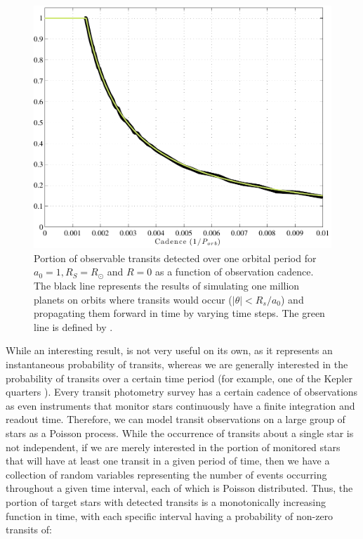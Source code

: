 \begin{figure}[ht]
\centering
\includegraphics[width=5in]{./figures/transitCadences}
\caption[Portion of observable transits detected over one period.]{Portion of observable transits detected over one orbital period for $a_0 = 1, R_S = R_\odot$ and $R = 0$ as a function of observation cadence. The black line represents the results of simulating one million planets on orbits where transits would occur ($\vert \theta \vert  < R_s/a_0$) and propagating them forward in time by varying time steps.  The green line is defined by .
\label{fig:transitCadences}}
\end{figure}
While an interesting result,  is not very useful on its own, as it represents an instantaneous probability of transits, whereas we are generally interested in the probability of transits over a certain time period (for example, one of the Kepler quarters \citep{borucki2010kepler}).  Every transit photometry survey has a certain cadence of observations as even instruments that monitor stars continuously have a finite integration and readout time.  Therefore, we can model transit observations on a large group of stars as a Poisson process.  While the occurrence of transits about a single star is not independent, if we are merely interested in the portion of monitored stars that will have at least one transit in a given period of time, then we have a collection of random variables representing the number of events occurring throughout a given time interval, each of which is Poisson distributed.  Thus, the portion of target stars with detected transits is a monotonically increasing function in time, with each specific interval having a probability of non-zero transits of:
